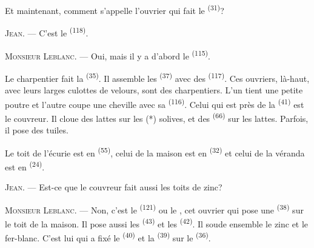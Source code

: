 Et maintenant, comment s'appelle l'ouvrier qui fait le 
\textsuperscript{(31)}?

\textsc{Jean}. --- C'est le  \textsuperscript{(118)}.

\VUsaut{3.0mm}
\VUsaut{3.0mm}

\textsc{Monsieur Leblanc}. --- Oui, mais il y a d'abord le
 \textsuperscript{(115)}.

Le charpentier fait la  \textsuperscript{(35)}. Il assemble
les  \textsuperscript{(37)} avec des 
\textsuperscript{(117)}. Ces ouvriers, là-haut, avec leurs larges culottes de
velours, sont des charpentiers. L'un tient une petite poutre et l'autre coupe
une cheville avec sa  \textsuperscript{(116)}. Celui qui est près
de la  \textsuperscript{(41)} est le couvreur. Il cloue des
lattes sur les (*) solives, et des  \textsuperscript{(66)} sur
les lattes. Parfois, il pose des tuiles.


Le toit de l'écurie est en  \textsuperscript{(55)}, celui de la
maison est en  \textsuperscript{(32)} et celui de la véranda
est en  \textsuperscript{(24)}.

\textsc{Jean}. --- Est-ce que le couvreur fait aussi les toits de zinc?

\textsc{Monsieur Leblanc}. --- Non, c'est le 
\textsuperscript{(121)} ou le , cet ouvrier qui pose une
 \textsuperscript{(38)} sur le toit de la maison. Il pose aussi
les  \textsuperscript{(43)} et les 
\textsuperscript{(42)}. Il soude ensemble le zinc et le fer-blanc. C'est lui qui
a fixé le  \textsuperscript{(40)} et la
 \textsuperscript{(39)} sur le 
\textsuperscript{(36)}.

